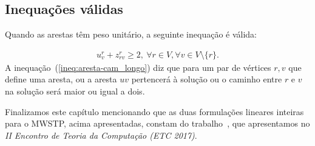 
\subsection{Inequações válidas}
Quando as arestas têm peso unitário, a seguinte inequação é válida: 

\begin{align}
  \label{ineq:aresta-cam_longo}
  u^{r}_{v} + z^{r}_{rv} \ge 2, \: \forall r \in V, \forall v \in V \setminus \{r\}. 
\end{align}
A inequação~(\ref{ineq:aresta-cam_longo}) diz que para um par de vértices $r,v$ que 
define uma aresta, ou a aresta $uv$ pertencerá à solução ou o caminho entre $r$ e $v$ 
na solução será maior ou igual a dois.



\bigskip
\medskip


Finalizamos este capítulo mencionando que as duas formulações lineares
inteiras para o MWSTP, acima apresentadas, constam do
trabalho~\cite{Braga2017}, que apresentamos  no \emph{II Encontro de Teoria
  da Computação (ETC 2017)}.

